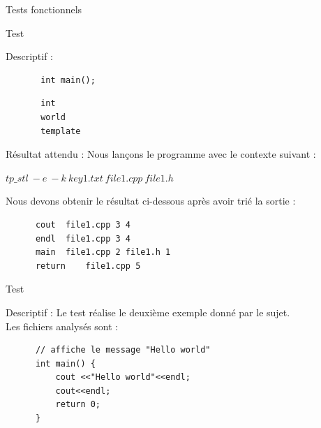 \documentclass{article}
\begin{document}
\begin{section}{Tests fonctionnels}
\begin{subsection}{Test }
\begin{paragraph}{Descriptif :}
      \begin{listing}[h!]
	\begin{verbatim}
	   int main();
	\end{verbatim}
      \end{listing}
      
        \begin{listing}[h!]
	\begin{verbatim}
	   int
	   world
	   template
	\end{verbatim}
      \end{listing}
      
    \end{paragraph}
    
    \begin{paragraph}{Résultat attendu :} 
      Nous lançons le programme avec le contexte suivant :  
       \begin{center}
	\textbf{$tp\_stl\ -e\ -k\ key1.txt\ file1.cpp\ file1.h$}
      \end{center}
      
      Nous devons obtenir le résultat ci-dessous après avoir trié la sortie : 
      \begin{listing}[h!]
      \begin{verbatim}
	  cout	file1.cpp 3 4	
	  endl	file1.cpp 3 4	
	  main	file1.cpp 2	file1.h 1	
	  return	file1.cpp 5	
      \end{verbatim}
  
      \end{listing}
    \end{paragraph}

 \end{subsection}
     
   \newpage 
       
  \begin{subsection}{Test }
  
    \begin{paragraph}{Descriptif :}
	Le test  réalise le deuxième exemple donné par le sujet.\\ Les fichiers analysés sont : 
      
      \begin{listing}[h!]
      \begin{verbatim}
	  // affiche le message "Hello world"
	  int main() {
	      cout <<"Hello world"<<endl;
	      cout<<endl;
	      return 0;
	  }
      \end{verbatim}
      \end{listing}
      

\end{paragraph}
\end{subsection}
\end{section}
\end{document}
